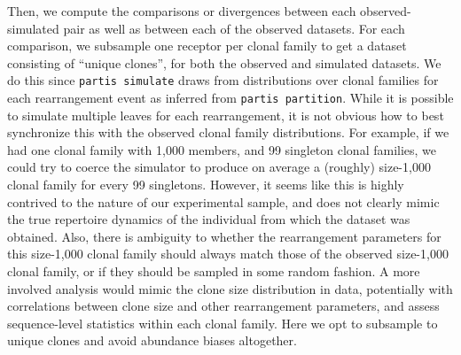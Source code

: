\documentclass{article}
\begin{document}
Then, we compute the comparisons or divergences between each observed-simulated pair as well as between each of the observed datasets.
For each comparison, we subsample one receptor per clonal family to get a dataset consisting of ``unique clones'', for both the observed and simulated datasets.
We do this since \texttt{partis simulate} draws from distributions over clonal families for each rearrangement event as inferred from \texttt{partis partition}.
While it is possible to simulate multiple leaves for each rearrangement, it is not obvious how to best synchronize this with the observed clonal family distributions.
For example, if we had one clonal family with 1,000 members, and 99 singleton clonal families, we could try to coerce the simulator to produce on average a (roughly) size-1,000 clonal family for every 99 singletons.
However, it seems like this is highly contrived to the nature of our experimental sample, and does not clearly mimic the true repertoire dynamics of the individual from which the dataset was obtained.
Also, there is ambiguity to whether the rearrangement parameters for this size-1,000 clonal family should always match those of the observed size-1,000 clonal family, or if they should be sampled in some random fashion.
A more involved analysis would mimic the clone size distribution in data, potentially with correlations between clone size and other rearrangement parameters, and assess sequence-level statistics within each clonal family.
Here we opt to subsample to unique clones and avoid abundance biases altogether.
\end{document}
